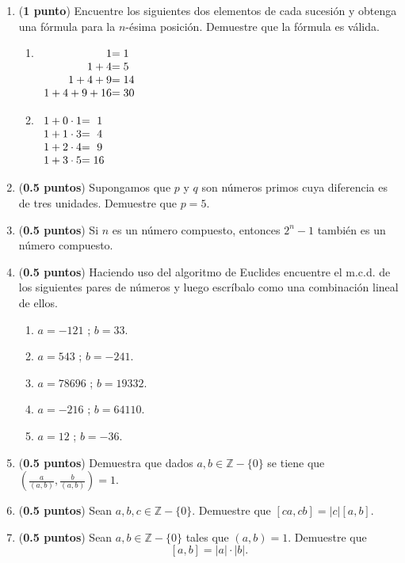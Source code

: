 \documentclass[fontsize=12pt]{scrartcl}
\begin{document}
\begin{enumerate}
		\item ({\bf 1 punto}) Encuentre los siguientes dos elementos de 
		cada sucesi\'on y obtenga una f\'ormula para la $n$-\'esima 
		posici\'on. Demuestre que la f\'ormula es v\'alida.
			\begin{enumerate}
			\item $\begin{array}[t]{r@{}l}
				1 			&= 	1	\\
				1 + 4 		&= 	5	\\
				1 + 4 + 9 		&= 	14	\\
				1 + 4 + 9 + 16 	&= 	30
			\end{array}$
			\item $\begin{array}[t]{r@{}l}
				1 + 0 \cdot 1 	&= 	\ 1 	\\
				1 + 1 \cdot 3 	&= 	\ 4 	\\
				1 + 2 \cdot 4 	&= 	\ 9 	\\
				1 + 3 \cdot 5 	&= 	16
			\end{array}$
			\end{enumerate}

		\item ({\bf 0.5 puntos}) Supongamos que $p$ y $q$ son n\'umeros 
		primos cuya diferencia es de tres unidades. Demuestre que $p = 5$.
		
		\item ({\bf 0.5 puntos}) Si $n$ es un n\'umero compuesto, entonces 
		$2^{n} - 1$ tambi\'en es un n\'umero compuesto.
		

	
		\item ({\bf 0.5 puntos}) Haciendo uso del algoritmo de Euclides encuentre 
		el m.c.d. de los siguientes pares de n\'umeros y luego escr\'ibalo 
		como una combinaci\'on lineal de ellos.
			\begin{enumerate}
				\item $a = -121$ ; $b = 33$.
				\item $a = 543$ ; $b = -241 $.
				\item $a = 78696$ ; $b = 19332$.
				\item $a = -216$ ; $b = 64110$.
				\item $a = 12$ ; $b = -36$.
			\end{enumerate}
			
	   	 \item ({\bf 0.5 puntos})  Demuestra que dados $a, b \in \mathbb{Z}-\{0\}$ 
		se tiene que $\left( \frac{a}{(a,b)}, \frac{b}{(a,b)} \right ) = 1$.

		\item ({\bf 0.5 puntos}) Sean $a, b, c \in \mathbb{Z}-\{0\}$. Demuestre que 
		$\left[ca, cb\right] = \lvert c \rvert \left[a,b\right]$.
		
		\item ({\bf 0.5 puntos}) Sean $a, b \in \mathbb{Z} - \{0\}$ tales que 
		$\left( a, b \right) = 1$. Demuestre que 
		\[
				\left[a,b\right] = \lvert a \rvert \cdot \lvert b \rvert.
		\]
	\end{enumerate}
	
\end{document}
